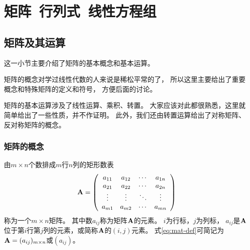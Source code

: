 \chapter{矩阵\ 行列式\ 线性方程组}

\section{矩阵及其运算}
这一小节主要介绍了矩阵的基本概念和基本运算。

矩阵的概念对学过线性代数的人来说是稀松平常的了，
所以这里主要给出了重要概念和特殊矩阵的定义和符号，
方便后面的讨论。

矩阵的基本运算涉及了线性运算、乘积、转置。
大家应该对此都很熟悉，这里就简单给出了一些性质，并不作证明。
此外，我们还由转置运算给出了对称矩阵、反对称矩阵的概念。

\subsection{矩阵的概念}
\begin{definition}[矩阵]
  由$m\times n$个数排成$m$行$n$列的矩形数表
  \begin{equation} \label{eq:mat-def}
    \mmA = \mmat{cccc}{
      a_{11} & a_{12} & \cdots & a_{1n} \\
      a_{21} & a_{22} & \cdots & a_{2n} \\
      \vdots & \vdots & \ddots & \vdots \\
      a_{m1} & a_{m2} & \cdots & a_{mn} }
  \end{equation}
  称为一个$m\times n$矩阵。
  其中数$a_{ij}$称为矩阵$\mmA$的元素。
  $i$为行标，$j$为列标，
  $a_{ij}$是$\mmA$位于第$i$行第$j$列的元素，或简称$\mmA$的$(i,j)$元素。
  式\eqref{eq:mat-def}可简记为$\mmA=(a_{ij})_{m\times n}$或$(a_{ij})$。
\end{definition}

